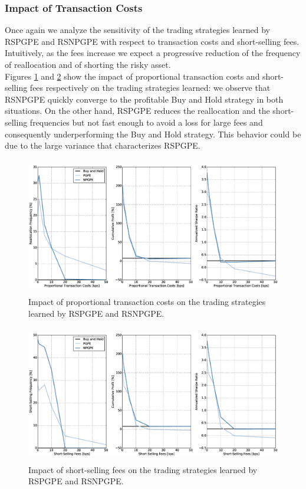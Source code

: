 \subsubsection{Impact of Transaction Costs}
Once again we analyze the sensitivity of the trading strategies learned by \gls{RSPGPE} and \gls{RSNPGPE} with respect to transaction costs and short-selling fees. Intuitively, as the fees increase we expect a progressive reduction of the frequency of reallocation and of shorting the risky asset.\\
Figures \ref{fig:8_6_impact_transaction_costs_RS} and \ref{fig:8_7_impact_short_selling_fees_RS} show the impact of proportional transaction costs and short-selling fees respectively on the trading strategies learned: we observe that \gls{RSNPGPE} quickly converge to the profitable Buy and Hold strategy in both situations. On the other hand, \gls{RSPGPE} reduces the reallocation and the short-selling frequencies but not fast enough to avoid a loss for large fees and consequently underperforming the Buy and Hold strategy. This behavior could be due to the large variance that characterizes \gls{RSPGPE}.

\begin{figure}[t!]
\centering
\includegraphics[height=6cm,width=1\linewidth]{Images/8_6_impact_transaction_costs_RS}
\caption[Proportional transaction costs and risk-sensitive strategies.]{Impact of proportional transaction costs on the trading strategies learned by RSPGPE and RSNPGPE.}
\label{fig:8_6_impact_transaction_costs_RS}
\end{figure}

\begin{figure}[t!]
\centering
\includegraphics[height=6cm,width=1\linewidth]{Images/8_7_impact_short_selling_fees_RS}
\caption[Short-selling fees and risk-sensitive strategies.]{Impact of short-selling fees on the trading strategies learned by RSPGPE and RSNPGPE.}
\label{fig:8_7_impact_short_selling_fees_RS}
\end{figure}

